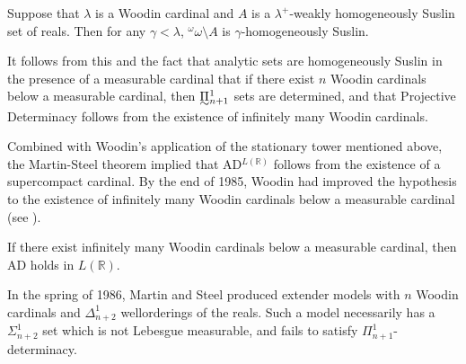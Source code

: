 \documentclass{book}%
\def\underTilde#1{{\baselineskip=0pt\vtop{\hbox{$#1$}\hbox{$\sim$}}}{}}
\newcommand{\uTPi}{\underTilde{\Pi}}
\begin{document}
\begin{theorem}\label{MartinSteeltheorem}
Suppose that
$\lambda$ is a Woodin cardinal and $A$ is a $\lambda^{+}$-weakly
homogeneously Suslin set of reals. Then for any $\gamma < \lambda$,
${^{\omega}\omega} \setminus A$ is $\gamma$-homogeneously Suslin.
\end{theorem}


It follows from this and the fact that analytic sets are homogeneously Suslin in the presence of a measurable cardinal
that if there exist $n$ Woodin cardinals below a
measurable cardinal, then $\uTPi^{1}_{n+1}$ sets are
determined, and that Projective
Determinacy follows from the existence of infinitely many Woodin
cardinals.

Combined with Woodin's application of the stationary tower mentioned above, the Martin-Steel theorem implied that AD$^{L(\mathbb{R})}$
follows from the existence of a supercompact cardinal. By the end of 1985, Woodin had improved the
hypothesis to the existence of infinitely many Woodin cardinals
below a measurable cardinal (see \cite{Larson:stationary}).

\begin{theorem}[Woodin]\label{adfromwoodins} If there exist infinitely many Woodin cardinals below a measurable cardinal, then
{\rm AD} holds in $L(\mathbb{R})$.
\end{theorem}




In the spring of 1986, Martin and Steel
 produced
extender models with $n$ Woodin cardinals and $\Delta^{1}_{n+2}$
wellorderings of the reals. Such a model necessarily has a
$\Sigma^{1}_{n+2}$ set which is not Lebesgue
measurable, and fails to satisfy $\Pi^{1}_{n+1}$-determinacy.
\end{document}
